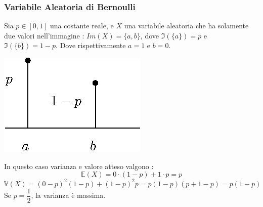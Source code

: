 \documentclass[12pt, letterpaper]{article}
\begin{document}
\subsubsection{Variabile Aleatoria di Bernoulli}
Sia \(p\in[0,1]\) una costante reale, e \(X\) una variabile aleatoria che ha solamente due 
valori nell'immagine : \(Im(X)=\{a,b\}\), dove \(\Im(\{a\})=p\) e \(\Im(\{b\})=1-p\).
Dove rispettivamente \(a=1\) e \(b=0\).
\begin{center}
    \includegraphics[scale=1]{images/VABernoulli.eps}
\end{center}
In questo caso varianza e valore atteso valgono : \begin{equation}
    \mathbb{E}(X)=0\cdot(1-p)+1\cdot p = p
\end{equation}\begin{equation}
    \mathbb{V}(X)=(0-p)^2(1-p)+(1-p)^2p=p(1-p)(p+1-p)=p(1-p)
\end{equation}
Se \(p=\dfrac{1}{2}\), la varianza è massima.
\end{document}

